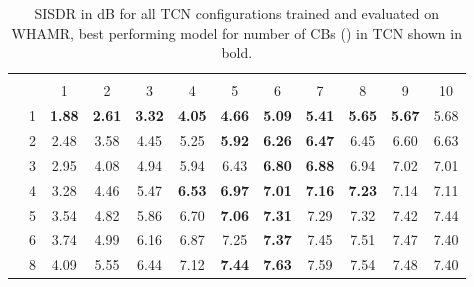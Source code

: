 \documentclass[conference,a4paper]{IEEEtran}
\begin{document}
\begin{table}[!ht]
\setlength\tabcolsep{2.5pt}
\caption{  \ac{SISDR} {in dB}
for all TCN configurations trained and evaluated on WHAMR, best performing model for number of \acp{CB} () in \ac{TCN} shown in bold.} 
\centering
\begin{tabular}{cc|cccccccccc|}
\cline{3-12}
&  & \multicolumn{10}{c|}{\cellcolor[HTML]{C0C0C0} }\\ 
\cline{3-12} 
 &  & 
 \cellcolor[HTML]{C0C0C0}1 & \cellcolor[HTML]{C0C0C0}2 & \cellcolor[HTML]{C0C0C0}3 & \cellcolor[HTML]{C0C0C0}4 & \cellcolor[HTML]{C0C0C0}5 & \cellcolor[HTML]{C0C0C0}6 & \cellcolor[HTML]{C0C0C0}7 & \cellcolor[HTML]{C0C0C0}8 & \cellcolor[HTML]{C0C0C0}9 & \cellcolor[HTML]{C0C0C0}10 \\ \hline
\multicolumn{1}{|c}{\cellcolor[HTML]{C0C0C0}} & \multicolumn{1}{|c|}{\cellcolor[HTML]{C0C0C0}1} & \bfseries 1.88 & \bfseries 2.61 &  \bfseries 3.32 & \bfseries 4.05 & \bfseries 4.66 & \bfseries 5.09 & \bfseries 5.41 & \bfseries 5.65 & \bfseries 5.67 & 5.68 \\
\multicolumn{1}{|c}{\cellcolor[HTML]{C0C0C0}}& \multicolumn{1}{|c|}{\cellcolor[HTML]{C0C0C0}2} & 2.48 & 3.58 & 4.45 & 5.25 & \bfseries 5.92 & \bfseries 6.26 & \bfseries 6.47 & 6.45 & 6.60 & 6.63 \\
\multicolumn{1}{|c}{\cellcolor[HTML]{C0C0C0}}& \multicolumn{1}{|c|}{\cellcolor[HTML]{C0C0C0}3} & 2.95 & 4.08 & 4.94 & 5.94 & 6.43 & \bfseries 6.80 & \bfseries 6.88 & 6.94 & 7.02 & 7.01 \\
\multicolumn{1}{|c}{\cellcolor[HTML]{C0C0C0}} & \multicolumn{1}{|c|}{\cellcolor[HTML]{C0C0C0}4} & 3.28 & 4.46 & 5.47 & \bfseries 6.53 & \bfseries 6.97 & \bfseries 7.01 & \bfseries 7.16 & \bfseries 7.23 & 7.14 & 7.11 \\
\multicolumn{1}{|c}{\cellcolor[HTML]{C0C0C0}} & \multicolumn{1}{|c|}{\cellcolor[HTML]{C0C0C0}5} & 3.54 & 4.82 & 5.86 & 6.70 & \bfseries 7.06 & \bfseries 7.31 & 7.29 & 7.32 & 7.42 & 7.44 \\
\multicolumn{1}{|c}{\cellcolor[HTML]{C0C0C0}} & \multicolumn{1}{|c|}{\cellcolor[HTML]{C0C0C0}6} & 3.74 & 4.99 & 6.16 & 6.87 & 7.25 & \bfseries 7.37 & 7.45 &  7.51 & 7.47 & 7.4{0} \\ 
\multicolumn{1}{|c}{\multirow{-8}{*}{\cellcolor[HTML]{C0C0C0}}} & \multicolumn{1}{|l|}{\cellcolor[HTML]{C0C0C0}8} & 4.09 & 5.55 & 6.44 & 7.12 & \bfseries 7.44 & \bfseries 7.63 & 7.59 & 7.54 & 7.48 & 7.4{0} \\ \hline
\end{tabular}
\label{tab:d_sisdr_results:whamr}
\end{table}
\end{document}
